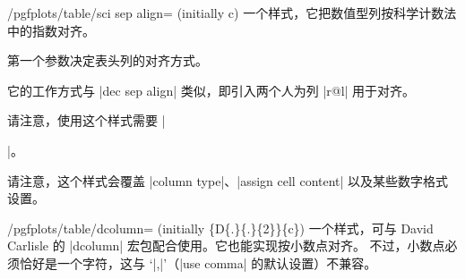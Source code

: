 \documentclass[a4paper,doc2]{ltxdoc}
\begin{document}
%

%
%
%

\begin{stylekey}{/pgfplots/table/sci sep align= (initially c)}
    一个样式，它把数值型列按科学计数法中的指数对齐。

    第一个参数决定表头列的对齐方式。

    它的工作方式与 |dec sep align| 类似，即引入两个人为列 |r@{}l| 用于对齐。

    请注意，使用这个样式需要 |\usepackage{array}|。

    请注意，这个样式会覆盖 |column type|、|assign cell content| 以及某些数字格式设置。
\end{stylekey}

\begin{stylekey}{/pgfplots/table/dcolumn= (initially \{D\{.\}\{.\}\{2\}\}\{c\})}
    一个样式，可与 David Carlisle 的 |dcolumn| 宏包配合使用。它也能实现按小数点对齐。
    不过，小数点必须恰好是一个字符，这与 `|{,}|'（|use comma| 的默认设置）不兼容。
\end{stylekey}
\end{document}
